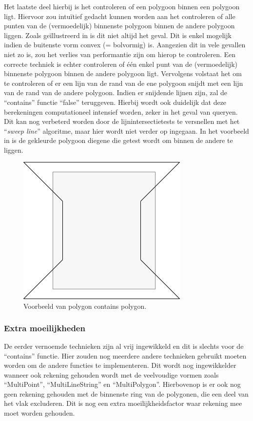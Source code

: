 Het laatste deel hierbij is het controleren of een polygoon binnen een polygoon ligt. Hiervoor zou intuïtief gedacht kunnen worden aan het controleren of alle punten van de (vermoedelijk) binnenste polygoon binnen de andere polygoon liggen. Zoals geïllustreerd in  is dit niet altijd het geval. Dit is enkel mogelijk indien de buitenste vorm convex (= bolvormig) is. Aangezien dit in vele gevallen niet zo is, zou het verlies van performantie zijn om hierop te controleren. Een correcte techniek is echter controleren of één enkel punt van de (vermoedelijk) binnenste polygoon binnen de andere polygoon ligt. Vervolgens volstaat het om te controleren of er een lijn van de rand van de ene polygoon snijdt met een lijn van de rand van de andere polygoon. Indien er snijdende lijnen zijn, zal de ``contains'' functie ``false'' teruggeven. Hierbij wordt ook duidelijk dat deze berekeningen computationeel intensief worden, zeker in het geval van queryen. Dit kan nog verbeterd worden door de lijnintersectietests te versnellen met het ``\textit{sweep line}'' algoritme, maar hier wordt niet verder op ingegaan. In het voorbeeld in  is de gekleurde polygoon diegene die getest wordt om binnen de andere te liggen.

\begin{figure}
    \centering
    \includegraphics[width=0.3\linewidth]{images/polygon_contains_polygon.png}
    \caption{Voorbeeld van polygon contains polygon.}
    \label{fig:polygon_contains_polygon}
\end{figure}


\subsubsection{Extra moeilijkheden}
De eerder vernoemde technieken zijn al vrij ingewikkeld en dit is slechts voor de ``contains'' functie. Hier zouden nog meerdere andere technieken gebruikt moeten worden om de andere functies te implementeren. Dit wordt nog ingewikkelder wanneer ook rekening gehouden wordt met de veelvoudige vormen zoals ``MultiPoint'', ``MultiLineString'' en ``MultiPolygon''. Hierbovenop is er ook nog geen rekening gehouden met de binnenste ring van de polygonen, die een deel van het vlak excluderen. Dit is nog een extra moeilijkheidsfactor waar rekening mee moet worden gehouden.  

